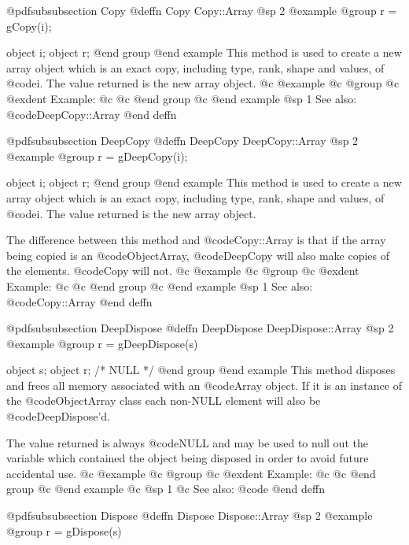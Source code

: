 @pdfsubsubsection {Copy}
@deffn {Copy} Copy::Array
@sp 2
@example
@group
r = gCopy(i);

object  i;
object  r;
@end group
@end example
This method is used to create a new array object which is an exact copy,
including type, rank, shape and values, of @code{i}.  The value returned
is the new array object.
@c @example
@c @group
@c @exdent Example:
@c 
@c @end group
@c @end example
@sp 1
See also:  @code{DeepCopy::Array}
@end deffn








@pdfsubsubsection {DeepCopy}
@deffn {DeepCopy} DeepCopy::Array
@sp 2
@example
@group
r = gDeepCopy(i);

object  i;
object  r;
@end group
@end example
This method is used to create a new array object which is an exact copy,
including type, rank, shape and values, of @code{i}.  The value returned
is the new array object.

The difference between this method and @code{Copy::Array} is that if the
array being copied is an @code{ObjectArray}, @code{DeepCopy} will also
make copies of the elements.  @code{Copy} will not.
@c @example
@c @group
@c @exdent Example:
@c 
@c @end group
@c @end example
@sp 1
See also:  @code{Copy::Array}
@end deffn









@pdfsubsubsection {DeepDispose}
@deffn {DeepDispose} DeepDispose::Array
@sp 2
@example
@group
r = gDeepDispose(s)

object  s;
object  r;     /*  NULL  */
@end group
@end example
This method disposes and frees all memory associated with an @code{Array}
object.  If it is an instance of the @code{ObjectArray} class each
non-NULL element will also be @code{DeepDispose}'d.  

The value returned is always @code{NULL} and may be used to null out
the variable which contained the object being disposed in order to
avoid future accidental use.
@c @example
@c @group
@c @exdent Example:
@c 
@c @end group
@c @end example
@c @sp 1
@c See also:  @code{}
@end deffn












@pdfsubsubsection {Dispose}
@deffn {Dispose} Dispose::Array
@sp 2
@example
@group
r = gDispose(s)

